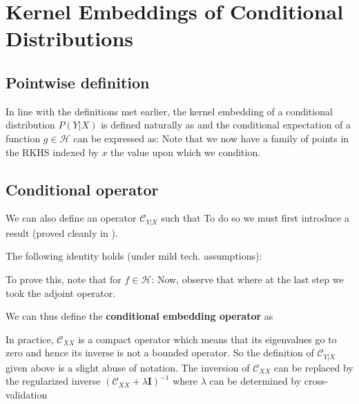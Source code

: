 \section{Kernel Embeddings of Conditional Distributions}
\subsection{Pointwise definition}
In line with the definitions met earlier, the kernel embedding of a conditional distribution $P(Y|X)$ is defined naturally as
and the conditional expectation of a function $g\in \mathcal H$ can be expressed as:
Note that we now have a family of points in the RKHS indexed by $x$ the value upon which we condition.
\subsection{Conditional operator}
We can also define an operator $\mathcal C_{Y|X}$ such that
To do so we must first introduce a result (proved cleanly in ).
\begin{ybox}
The following identity holds (under mild tech. assumptions):
\end{ybox}
To prove this, note that for $f\in \mathcal H$:
Now, observe that
where at the last step we took the adjoint operator.
\begin{ybox}
We can thus define the \textbf{conditional embedding operator} as
\end{ybox}
In practice, $\mathcal C_{XX}$ is a compact operator which means that its eigenvalues go to zero and hence its inverse is not a bounded operator. So the definition of $\mathcal C_{Y|X}$ given above is a slight abuse of notation. The inversion of $\mathcal C_{XX}$ can be replaced by the regularized inverse $(\mathcal C_{XX}+\lambda \mathbf I)^{-1}$ where $\lambda$ can be determined by cross-validation
